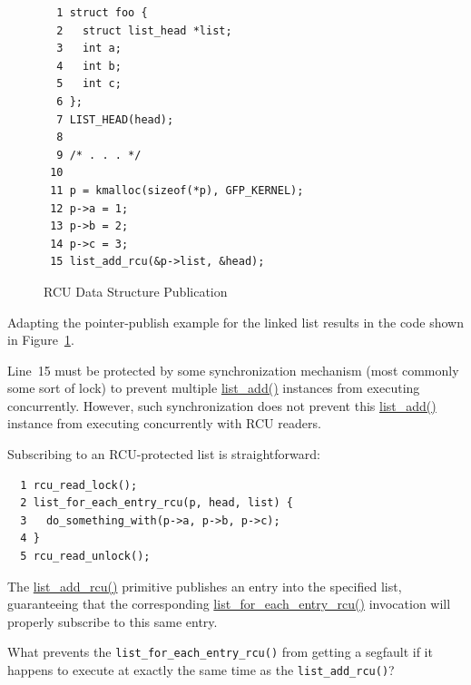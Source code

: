 \begin{figure}[tbp]
{ \scriptsize
\begin{verbatim}
  1 struct foo {
  2   struct list_head *list;
  3   int a;
  4   int b;
  5   int c;
  6 };
  7 LIST_HEAD(head);
  8
  9 /* . . . */
 10
 11 p = kmalloc(sizeof(*p), GFP_KERNEL);
 12 p->a = 1;
 13 p->b = 2;
 14 p->c = 3;
 15 list_add_rcu(&p->list, &head);
\end{verbatim}
}
\caption{RCU Data Structure Publication}
\label{fig:defer:RCU Data Structure Publication}
\end{figure}

Adapting the pointer-publish example for the linked list results in
the code shown in
Figure~\ref{fig:defer:RCU Data Structure Publication}.

Line~15 must be protected by some synchronization mechanism (most
commonly some sort of lock) to prevent multiple \url{list_add()}
instances from executing concurrently.
However, such synchronization does not prevent this \url{list_add()}
instance from executing concurrently with RCU readers.

Subscribing to an RCU-protected list is straightforward:

\vspace{5pt}
\begin{minipage}[t]{\columnwidth}
\scriptsize
\begin{verbatim}
  1 rcu_read_lock();
  2 list_for_each_entry_rcu(p, head, list) {
  3   do_something_with(p->a, p->b, p->c);
  4 }
  5 rcu_read_unlock();
\end{verbatim}
\end{minipage}
\vspace{5pt}

The \url{list_add_rcu()} primitive publishes
an entry into the specified list, guaranteeing that the corresponding
\url{list_for_each_entry_rcu()} invocation will properly
subscribe to this same entry.

\QuickQuiz{}
	What prevents the {\tt list\_for\_each\_entry\_rcu()} from
	getting a segfault if it happens to execute at exactly the same
	time as the {\tt list\_add\_rcu()}?
 \QuickQuizEnd

